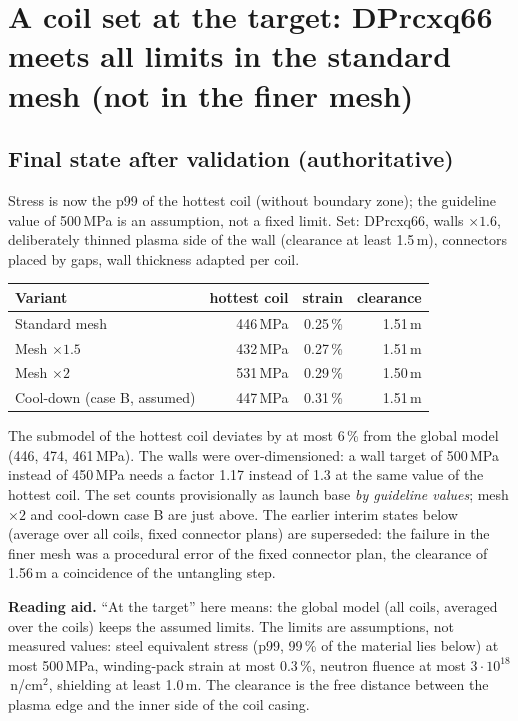 \section{A coil set at the target: DPrcxq66 meets all limits in the standard mesh (not in the finer mesh)}\label{sec:ziel}

\subsection*{Final state after validation (authoritative)}
Stress is now the p99 of the hottest coil (without boundary zone); the guideline value of 500\,MPa is an assumption, not a fixed limit. Set: DPrcxq66, walls $\times1.6$, deliberately thinned plasma side of the wall (clearance at least 1.5\,m), connectors placed by gaps, wall thickness adapted per coil.

\begin{tabular}{lrrr}
\hline
Variant & hottest coil & strain & clearance \\ \hline
Standard mesh & 446\,MPa & 0.25\,\% & 1.51\,m \\
Mesh $\times1.5$ & 432\,MPa & 0.27\,\% & 1.51\,m \\
Mesh $\times2$ & 531\,MPa & 0.29\,\% & 1.50\,m \\
Cool-down (case B, assumed) & 447\,MPa & 0.31\,\% & 1.51\,m \\ \hline
\end{tabular}

\smallskip
\noindent The submodel of the hottest coil deviates by at most 6\,\% from the global model (446, 474, 461\,MPa). The walls were over-dimensioned: a wall target of 500\,MPa
instead of 450\,MPa needs a factor 1.17 instead of 1.3 at the same value of the hottest coil. The set counts provisionally as launch base \emph{by guideline values}; mesh $\times2$ and cool-down case B are just above.
The earlier interim states below (average over all coils, fixed connector plans) are superseded: the failure in the finer mesh was a procedural error of the fixed connector plan, the clearance of 1.56\,m a coincidence of the untangling step.


\textbf{Reading aid.} ``At the target'' here means: the global model (all coils, averaged over the coils) keeps the assumed limits.
The limits are assumptions, not measured values: steel equivalent stress (p99, 99\,\% of the material lies below) at most 500\,MPa,
winding-pack strain at most 0.3\,\%, neutron fluence at most $3\cdot10^{18}$\,n/cm$^2$, shielding at least 1.0\,m.
The clearance is the free distance between the plasma edge and the inner side of the coil casing.


